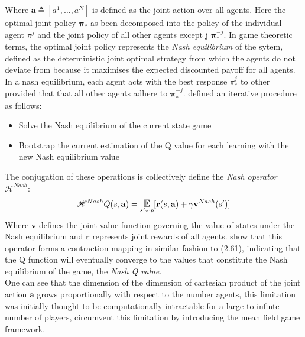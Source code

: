Where $\mathbf{a} \triangleq [a^1, \hdots, a^N]$ is defined as the joint action over all agents.
Here the optimal joint policy $\boldsymbol \pi_*$ as been decomposed into the policy of the individual
agent $\pi^j$ and the joint policy of all other agents except j $\boldsymbol \pi_*^{-j}$.
In game theoretic terms, the optimal joint policy represents the \emph{Nash equilibrium} of the
sytem, defined as the deterministic joint optimal strategy from which the agents do not deviate from
because it maximises the expected discounted payoff for all agents.
In a nash equilibrium, each agent acts with the best response $\pi^j_*$ to other provided that
that all other agents adhere to $\boldsymbol \pi^{-j}_*$. \cite{Hu2003} defined an iterative 
procedure as follows:
\begin{itemize}
    \item Solve the Nash equilibrium of the current state game
    \item Bootstrap the current estimation of the Q value for each learning with the new Nash equilibrium value
\end{itemize}
The conjugation of these operations is collectively define the \emph{Nash operator} $\mathscr{H}^{Nash}$:
\begin{equation}
    \mathscr{H}^{Nash}Q(s, \mathbf{a}) = \E_{s' \backsim p}[\mathbf{r}(s, \mathbf{a}) + \gamma \mathbf{v}^{Nash}(s')]
\end{equation}
Where $\mathbf{v}$ defines the joint value function governing the value of states under the Nash equilibrium and $\mathbf{r}$
represents joint rewards of all agents.
\cite{Hu2003} show that this operator forms a contraction mapping in similar fashion to (2.61), indicating
that the Q function will eventually converge to the values that constitute the Nash equilibrium
of the game, the \emph{Nash Q value}. \\

One can see that the dimension of the dimension of cartesian product of the joint action $\mathbf{a}$ 
grows proportionally with respect to the number agents, this limitation was initially thought
to be computationally intractable for a large to infinte number of players, \cite{Yang2018}
circumvent this limitation by introducing the mean field game framework.
